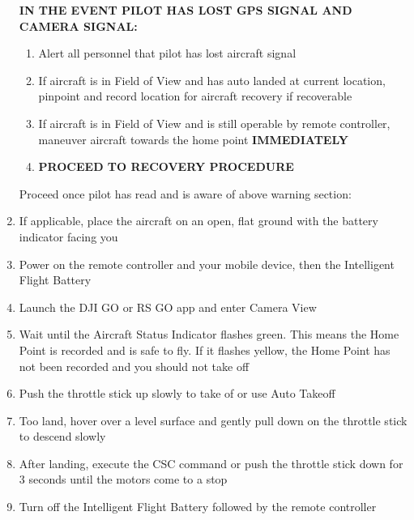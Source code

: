 \begin{enumerate}
\textbf{IN THE EVENT PILOT HAS LOST GPS SIGNAL AND CAMERA SIGNAL:}
\begin{enumerate}
\setlength{\itemsep}{0em}
\setlength{\parskip}{0em}
\item Alert all personnel that pilot has lost aircraft signal
\item If aircraft is in Field of View and has auto landed at current location, pinpoint and record location for aircraft recovery if recoverable
\item If aircraft is in Field of View and is still operable by remote controller, maneuver aircraft towards the home point \textbf{IMMEDIATELY}
\item \textbf{PROCEED TO RECOVERY PROCEDURE}
\end{enumerate}

Proceed once pilot has read and is aware of above warning section:
\item If applicable, place the aircraft on an open, flat ground with the battery indicator facing you
\item Power on the remote controller and your mobile device, then the Intelligent Flight Battery
\item Launch the DJI GO or RS GO app and enter Camera View
\item Wait until the Aircraft Status Indicator flashes green. This means the Home Point is recorded and is safe to fly. If it flashes yellow, the Home Point has not been recorded and you should not take off
\item Push the throttle stick up slowly to take of or use Auto Takeoff
\item Too land, hover over a level surface and gently pull down on the throttle stick to descend slowly
\item After landing, execute the CSC command or push the throttle stick down for 3 seconds until the motors come to a stop
\item Turn off the Intelligent Flight Battery followed by the remote controller
\end{enumerate}


 

